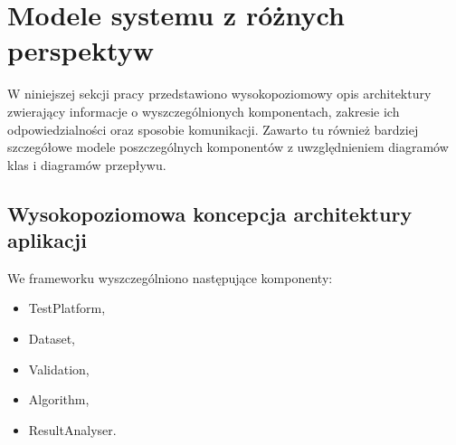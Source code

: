 \documentclass[12pt]{article}
\begin{document}
\section{Modele systemu z różnych perspektyw}

W niniejszej sekcji pracy przedstawiono wysokopoziomowy opis architektury zwierający informacje o wyszczególnionych komponentach, zakresie ich odpowiedzialności oraz sposobie komunikacji. Zawarto tu również bardziej szczegółowe modele poszczególnych komponentów z uwzględnieniem diagramów klas i diagramów przepływu.

\subsection{Wysokopoziomowa koncepcja architektury aplikacji}

We frameworku wyszczególniono następujące komponenty:

\begin{itemize}
	\item TestPlatform,
	\item Dataset,
	\item Validation,
	\item Algorithm,
	\item ResultAnalyser.
\end{itemize}
\end{document}
